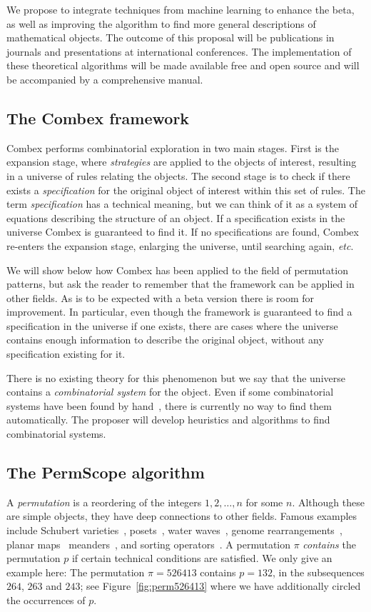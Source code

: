 \documentclass{rannis}
\newcommand{\motheralg}{\textsf{Combex}}
\newcommand{\tilealg}{\textsf{PermScope}}
\theoremstyle{definition}
\begin{document}
We propose to integrate techniques from machine learning to enhance the beta,
as well as improving the algorithm to find more general descriptions
of mathematical objects.
The outcome of this proposal will be
publications in journals and presentations at international
conferences. The implementation of
these theoretical algorithms will be made available free and open source and
will be accompanied by a comprehensive manual.
\subsection*{The \motheralg{} framework}

\motheralg{} performs combinatorial
exploration in two main stages. First is the expansion stage, where \emph{strategies} are
applied to the objects of interest, resulting in a universe of rules
relating the objects. The second stage is to check if there exists
a \emph{specification} for the original object of interest
within this set of rules. The term \emph{specification} has a technical meaning,
but we can think of it as a system of equations describing the structure of an
object. If a specification exists in the universe \motheralg{} is guaranteed to
find it.
If no specifications are found, \motheralg{} re-enters the expansion stage,
enlarging the universe, until searching again, \emph{etc}.

We will show below how \motheralg{} has been applied to the field of permutation
patterns, but ask the reader to remember that the framework can be applied in
other fields.
As is to be expected with a beta version there is room for improvement. In
particular, even though the
framework is guaranteed to find a specification in the universe if
one exists, there are cases where the universe contains enough information to
describe the original object, without any specification existing for it.

There is no existing theory for this phenomenon but we say
that the universe contains a \emph{combinatorial system} for the object.
Even if some combinatorial systems have been found by hand~\cite{BeanPhd},
there is currently no way to find them automatically.
The proposer will develop heuristics and algorithms to find combinatorial systems.

\subsection*{The \tilealg{} algorithm}
A \emph{permutation} is a reordering of the integers $1, 2, \dotsc, n$
for some $n$. Although
these are simple objects, they have deep connections to other fields. Famous
examples include Schubert varieties~\cite{MR1051089}, posets~\cite{MR2652101},
water waves~\cite{MR2813307}, genome rearrangements~\cite{MR2518996}, planar maps~\cite{CKS09}
meanders~\cite{fukuda:042202}, and sorting operators~\cite{MR0445948}.
A permutation $\pi$ \emph{contains} the permutation $p$ if certain technical
conditions are satisfied. We only give an example here: The permutation $\pi = 526413$
contains $p = 132$,  in the subsequences $264$, $263$ and $243$; see
Figure~\ref{fig:perm526413} where we have additionally circled the occurrences of $p$.
\end{document}
